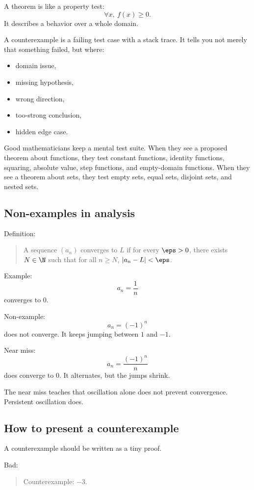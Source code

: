 A theorem is like a property test:
\[
\forall x,\ f(x)\geq0.
\]
It describes a behavior over a whole domain.

A counterexample is a failing test case with a stack trace. It tells you not merely that something failed, but where:

\begin{itemize}
\item domain issue,
\item missing hypothesis,
\item wrong direction,
\item too-strong conclusion,
\item hidden edge case.
\end{itemize}

Good mathematicians keep a mental test suite. When they see a proposed theorem about functions, they test constant functions, identity functions, squaring, absolute value, step functions, and empty-domain functions. When they see a theorem about sets, they test empty sets, equal sets, disjoint sets, and nested sets.

\subsection{Non-examples in analysis}

Definition:

\begin{quote}
A sequence $(a_n)$ converges to $L$ if for every $\eps>0$, there exists $N\in\N$ such that for all $n\geq N$, $|a_n-L|<\eps$.
\end{quote}

Example:
\[
a_n=\frac1n
\]
converges to $0$.

Non-example:
\[
a_n=(-1)^n
\]
does not converge. It keeps jumping between $1$ and $-1$.

Near miss:
\[
a_n=\frac{(-1)^n}{n}
\]
does converge to $0$. It alternates, but the jumps shrink.

The near miss teaches that oscillation alone does not prevent convergence. Persistent oscillation does.

\subsection{How to present a counterexample}

A counterexample should be written as a tiny proof.

Bad:

\begin{quote}
Counterexample: $-3$.
\end{quote}

